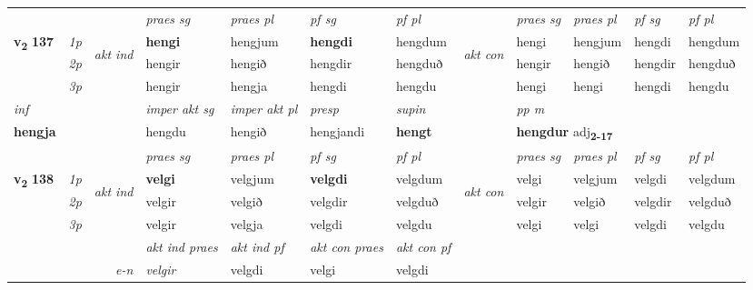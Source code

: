 \begin{longtable}[l]{X>{\footnotesize\itshape}llXXXXlXXXX}
 & &   & \textit{praes sg}  & \textit{praes pl}    & \textit{ pf sg} & \textit{pf pl} & & \textit{praes sg}  & \textit{praes pl}    & \textit{pf sg} & \textit{pf pl }  \\ \cmidrule{4-7} \cmidrule{9-12}
 \multirow{2}{*}{{{\textbf{v{\textsubscript{2}}} \Large{\textbf{137}}}}}  & 1p & \multirow{3}{*}{\begin{turn}{90}\textit{akt ind}\end{turn}} & \textbf{hengi} & hengjum & \textbf{hengdi} & hengdum & \multirow{3}{*}{\begin{turn}{90}\textit{akt con}\end{turn}} &hengi & hengjum & hengdi & hengdum\\*
 & 2p &  &  hengir  & hengið & hengdir & hengduð & & hengir & hengið & hengdir & hengduð \\*
 & 3p &  & hengir & hengja & hengdi & hengdu & & hengi & hengi& hengdi & hengdu \\*
\cmidrule{4-7} \cmidrule{9-12}

   {\textit{inf}} & &  & \textit{imper akt sg} & \textit{imper akt pl}   & \textit{presp} & \textit{supin}  && \textit{pp m} \\*
  {\textbf{hengja}} & && hengdu  & hengið   & hengjandi &  \textbf{hengt}  && \multicolumn{2}{l}{\textbf{hengdur} adj\textbf{\textsubscript{2-17}}} \\*

\midrule

 & &   & \textit{praes sg}  & \textit{praes pl}    & \textit{ pf sg} & \textit{pf pl} & & \textit{praes sg}  & \textit{praes pl}    & \textit{pf sg} & \textit{pf pl }  \\ \cmidrule{4-7} \cmidrule{9-12}
 \multirow{2}{*}{{{\textbf{v{\textsubscript{2}}} \Large{\textbf{138}}}}}  & 1p & \multirow{3}{*}{\begin{turn}{90}\textit{akt ind}\end{turn}} & \textbf{velgi} & velgjum & \textbf{velgdi} & velgdum & \multirow{3}{*}{\begin{turn}{90}\textit{akt con}\end{turn}} &velgi & velgjum & velgdi & velgdum\\*
 & 2p &  &  velgir  & velgið & velgdir & velgduð & & velgir & velgið & velgdir & velgduð \\*
 & 3p &  & velgir & velgja & velgdi & velgdu & & velgi & velgi& velgdi & velgdu \\*
\cmidrule{4-7} \cmidrule{9-12}

   && &  \textit{akt ind praes} & \textit{akt ind pf} & \textit{akt con praes} & \textit{akt con pf} \\*
\multicolumn{3}{r}{\textit{e-n}} & velgir & velgdi & velgi & velgdi \\*


\end{longtable}
